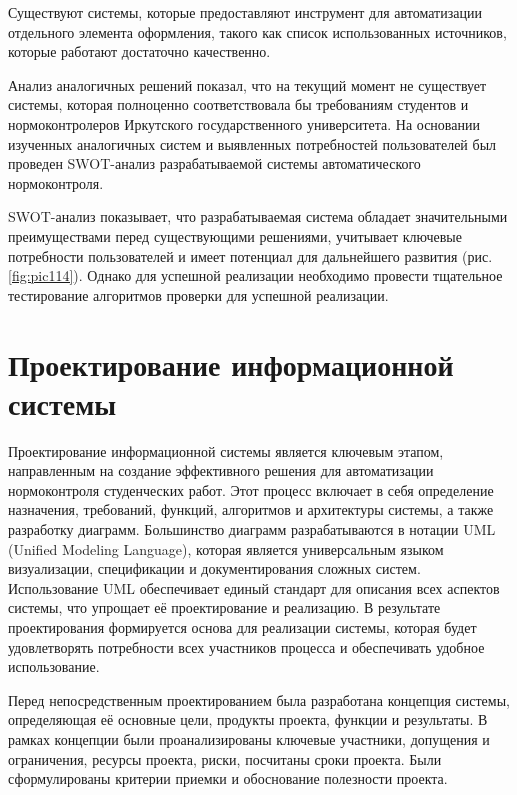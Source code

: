 \documentclass{report}
\begin{document}
Существуют системы, которые предоставляют инструмент для автоматизации отдельного элемента оформления, такого как список использованных источников, которые работают достаточно качественно.


Анализ аналогичных решений показал, что на текущий момент не существует системы, которая полноценно соответствовала бы требованиям студентов и нормоконтролеров Иркутского государственного университета. На основании изученных аналогичных систем и выявленных потребностей пользователей был проведен SWOT-анализ разрабатываемой системы автоматического нормоконтроля.

SWOT-анализ показывает, что разрабатываемая система обладает значительными преимуществами перед существующими решениями, учитывает ключевые потребности пользователей и имеет потенциал для дальнейшего развития (рис. \ref{fig:pic114}). Однако для успешной реализации необходимо провести тщательное тестирование алгоритмов проверки для успешной реализации.




\section{Проектирование информационной системы}

Проектирование информационной системы является ключевым этапом, направленным на создание эффективного решения для автоматизации нормоконтроля студенческих работ. Этот процесс включает в себя определение назначения, требований, функций, алгоритмов и архитектуры системы, а также разработку диаграмм. Большинство диаграмм разрабатываются в нотации UML (Unified Modeling Language), которая является универсальным языком визуализации, спецификации и документирования сложных систем. Использование UML обеспечивает единый стандарт для описания всех аспектов системы, что упрощает её проектирование и реализацию. В результате проектирования формируется основа для реализации системы, которая будет удовлетворять потребности всех участников процесса и обеспечивать удобное использование.

Перед непосредственным проектированием была разработана концепция системы, определяющая её основные цели, продукты проекта, функции и результаты. В рамках концепции были проанализированы ключевые участники, допущения и ограничения, ресурсы проекта, риски, посчитаны сроки проекта. Были сформулированы критерии приемки и обоснование полезности проекта.
\end{document}
